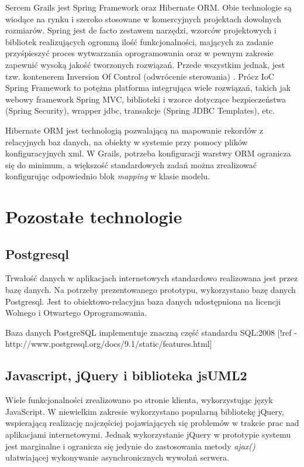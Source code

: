       Sercem Grails jest Spring Framework oraz Hibernate ORM. Obie technologie są wiodące na rynku i szeroko stosowane w komercyjnych projektach dowolnych rozmiarów. Spring jest de facto zestawem narzędzi, wzorców projektowych i bibliotek realizujących ogromną ilość funkcjonalności, mających za zadanie przyśpieszyć proces wytwarzania oprogramowania oraz w pewnym zakresie zapewnić wysoką jakość tworzonych rozwiązań. Przede wszystkim jednak, jest tzw. kontenerem Inversion Of Control (odwrócenie sterowania) \cite{MFow01}. Prócz IoC Spring Framework to potężna platforma integrująca wiele rozwiązań, takich jak webowy framework Spring MVC, biblioteki i wzorce dotyczące bezpieczeństwa (Spring Security), wrapper jdbc, transakcje (Spring JDBC Templates), etc.

      Hibernate ORM jest technologią pozwalającą na mapowanie rekordów z relacyjnych baz danych, na obiekty w systemie przy pomocy plików konfiguracyjnych xml. W Grails, potrzeba konfiguracji warstwy ORM ogranicza się do minimum, a większość standardowych zadań można zrealizować konfigurując odpowiednio blok \emph{mapping} w klasie modelu.

  \section{Pozostałe technologie}
    \subsection{Postgresql}
      Trwałość danych w aplikacjach internetowych standardowo realizowana jest przez bazę danych. Na potrzeby prezentowanego prototypu, wykorzystano bazę danych Postgresql. Jest to obiektowo-relacyjna baza danych udostępniona na licencji Wolnego i Otwartego Oprogramowania. 

      Baza danych PostgreSQL implementuje znaczną część standardu SQL:2008 [!ref - http://www.postgresql.org/docs/9.1/static/features.html]

    \subsection{Javascript, jQuery i biblioteka jsUML2}

      Wiele funkcjonalności zrealizowano po stronie klienta, wykorzystując język JavaScript. W niewielkim zakresie wykorzystano popularną bibliotekę jQuery, wspierającą realizację najczęściej pojawiających się problemów w trakcie prac nad aplikacjami internetowymi. Jednak wykorzystanie jQuery w prototypie systemu jest marginalne i ogranicza się jedynie do zastosowania metody \emph{ajax()} ułatwiającej wykonywanie asynchronicznych wywołań serwera.

